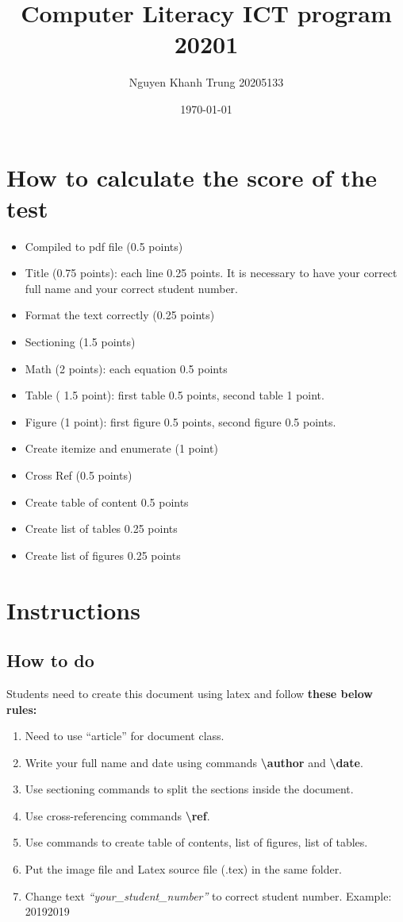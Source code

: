 \documentclass{article}
\title{Computer Literacy ICT program 20201}
\author{Nguyen Khanh Trung 20205133}
\date{\today}
\begin{document}
	\maketitle
	
	\section{How to calculate the score of the test}
		\begin{itemize}
			\item Compiled to pdf file (0.5 points)
			\item Title (0.75 points): each line 0.25 points. It is necessary to have your
correct full name and your correct student number.
			\item Format the text correctly (0.25 points)
			\item Sectioning (1.5 points)
			\item Math (2 points): each equation 0.5 points
			\item Table ( 1.5 point): first table 0.5 points, second table 1 point.
			\item Figure (1 point): first figure 0.5 points, second figure 0.5 points.
			\item Create itemize and enumerate (1 point)
			\item Cross Ref (0.5 points)
			\item Create table of content 0.5 points
			\item Create list of tables 0.25 points
			\item Create list of figures 0.25 points
		\end{itemize}
		
	\section{Instructions}
		\subsection{How to do}
			Students need to create this document using latex and follow \textbf{these below rules:}
			\begin{enumerate}
				\item Need to use ``article'' for document class.
				\item Write your full name and date using commands \textbf{\textbackslash{author}} and \textbf{\textbackslash{date}}.
				\item Use sectioning commands to split the sections inside the document.
				\item Use cross-referencing commands \textbf{\textbackslash{ref}}.
				\item Use commands to create table of contents, list of figures, list of tables.
				\item Put the image file and Latex source file (.tex) in the same folder.
				\item Change text \textit{``your\_student\_number''} to correct student number. Example: 20192019
			\end{enumerate}
		
\end{document}
